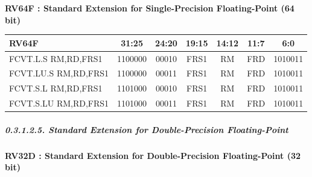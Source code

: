 \documentclass[
]{article}
\begin{document}
\textbf{RV64F : Standard Extension for Single-Precision Floating-Point
(64 bit)}

\begin{longtable}[]{@{}lcccccc@{}}
\toprule
RV64F & 31:25 & 24:20 & 19:15 & 14:12 & 11:7 & 6:0\tabularnewline
\midrule
\endhead
FCVT.L.S RM,RD,FRS1 & 1100000 & 00010 & FRS1 & RM & FRD &
1010011\tabularnewline
FCVT.LU.S RM,RD,FRS1 & 1100000 & 00011 & FRS1 & RM & FRD &
1010011\tabularnewline
FCVT.S.L RM,RD,FRS1 & 1101000 & 00010 & FRS1 & RM & FRD &
1010011\tabularnewline
FCVT.S.LU RM,RD,FRS1 & 1101000 & 00011 & FRS1 & RM & FRD &
1010011\tabularnewline
\bottomrule
\end{longtable}

\hypertarget{standard-extension-for-double-precision-floating-point-1}{%
\subparagraph{0.3.1.2.5. Standard Extension for Double-Precision
Floating-Point}\label{standard-extension-for-double-precision-floating-point-1}}

\textbf{RV32D : Standard Extension for Double-Precision Floating-Point
(32 bit)}
\end{document}

